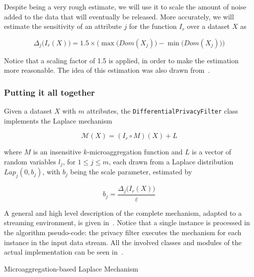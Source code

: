 Despite being a very rough estimate, we will use it to scale the amount of noise added to the data that will eventually be released. More accurately, we will estimate the sensitivity of an attribute $j$ for the function $I_r$ over a dataset $X$ as

\begin{equation}
\Delta_j\big(I_r(X)\big) = 1.5 \times \Big(\max\big(Dom(X_j)) - \min\big(Dom(X_j))\Big)
\end{equation}

Notice that a scaling factor of 1.5 is applied, in order to make the estimation more reasonable. The idea of this estimation was also drawn from~\citet{Domingo:EnhancingDiffPrivMicroaggregation}.

\subsubsection{Putting it all together}
\label{Implementation:DifferentialPrivacy:Design:AllTogether}

Given a dataset $X$ with $m$ attributes, the \texttt{DifferentialPrivacyFilter} class implements the Laplace mechanism 

\begin{equation*}
\mathcal{M}(X) = (I_r \circ M)(X) + L
\end{equation*}

where $M$ is an insensitive $k$-microaggregation function and $L$ is a vector of random variables $l_j$, for $1 \leq j \leq m$, each drawn from a Laplace distribution $Lap_j(0,b_j)$, with $b_j$ being the scale parameter, estimated by

\begin{equation*}
b_j = \frac{\Delta_j\big(I_r(X)\big)}{\varepsilon}
\end{equation*}

A general and high level description of the complete mechanism, adapted to a streaming environment, is given in~. Notice that a single instance is processed in the algorithm pseudo-code: the privacy filter executes the mechanism for each instance in the input data stream. All the involved classes and modules of the actual implementation can be seen in~.

\begin{algorithm}[h]
\caption{Microaggregation-based Laplace Mechanism\label{al:laplace-mechanism}}
\end{algorithm}

